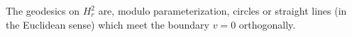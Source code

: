 The geodesics on $H_r^2$ are, modulo parameterization, circles or straight lines (in the Euclidean sense) which meet the boundary $v = 0$ orthogonally.
